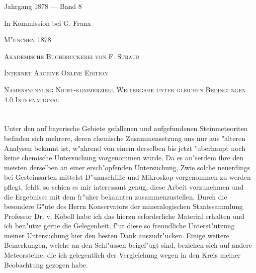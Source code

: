\documentclass[a4paper, 11pt, oneside]{article}
\begin{document}
\begin{titlepage}
	{\Large Jahrgang 1878 --- Band 8} %
	
	\vspace*{1\baselineskip} %
	
    {\Large In Kommission bei G. Franx} %
    
    \vspace*{\fill}

	\vspace{1\baselineskip}

	{\small\scshape M"unchen 1878}
	
	{\small\scshape{Akademische Buchdruckerei von F. Straub}}
	
	\vspace{0.5\baselineskip} %

    \scshape Internet Archive Online Edition  %
	
	{\scshape\small Namensnennung Nicht-kommerziell Weitergabe unter gleichen Bedingungen 4.0 International} %
\end{titlepage}
\setlength{\parskip}{1mm plus1mm minus1mm}
\clearpage
\tableofcontents
\clearpage
\LARGE
\pagestyle{fancy}
\fancyhf{}
\cfoot{\frakfamily{\thepage}}
\section{}
\subsection*{}
\paragraph{}
Unter den auf bayerische Gebiete gefallenen und aufgefundenen Steinmeteoriten befinden sich mehrere, deren chemische Zusammensetzung uns nur aus "alteren Analysen bekannt ist, w"ahrend von einem derselben bis jetzt "uberhaupt noch keine chemische Untersuchung vorgenommen wurde. Da es au"serdem ihre den meisten derselben an einer ersch"opfenden Untersuchung, Zwie solche neuerdings bei Gesteinsarten mittelst D"unnschliffe und Mikroskop vorgenommen zu werden pflegt, fehlt, so schien es mir interessant genug, diese Arbeit vorzunehmen und die Ergebnisse mit dem fr"uher bekannten zusammenzustellen. Durch die besondere G"ute des Herrn Konservators der mineralogischen Staatssammlung Professor Dr. v. Kobell habe ich das hierzu erforderliche Material erhalten und ich ben"utze gerne die Gelegenheit, f"ur diese so freundliche Unterst"utzung meiner Untersuchung hier den besten Dank auszudr"ucken. Einige weitere Bemerkungen, welche an den Schl"ussen beigef"ugt sind, beziehen sich auf andere Meteorsteine, die ich gelegentlich der Vergleichung wegen in den Kreis meiner Beobachtung gezogen habe.
\end{document}
